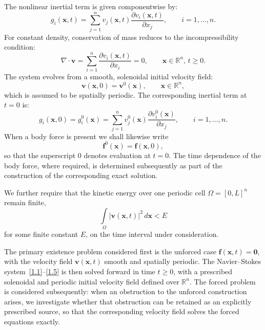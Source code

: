 \documentclass[11pt]{jfm}
\numberwithin{equation}{section}
\begin{document}
The nonlinear inertial term is given componentwise by:
\begin{equation}
\label{1.2}
g_i(\boldsymbol{x}, t) = \sum_{j=1}^n v_j(\boldsymbol{x}, t) \frac{\partial v_i(\boldsymbol{x}, t)}{\partial x_j}, \qquad i = 1, \dots, n.
\end{equation}
For constant density, conservation of mass reduces to the incompressibility condition:
\begin{equation}
\label{1.3}
\nabla \cdot \boldsymbol{v} = \sum_{i=1}^n \frac{\partial v_i(\boldsymbol{x}, t)}{\partial x_i} = 0, \qquad \boldsymbol{x} \in \mathbb{R}^n, \, t \geq 0.
\end{equation}
The system evolves from a smooth, solenoidal initial velocity field:
\begin{equation}
\label{1.4}
\boldsymbol{v}(\boldsymbol{x}, 0) = \boldsymbol{v}^0(\boldsymbol{x}), \qquad \boldsymbol{x} \in \mathbb{R}^n,
\end{equation}
which is assumed to be spatially periodic. The corresponding inertial term at \( t = 0 \) is:
\begin{equation}
\label{1.5}
g_i(\boldsymbol{x}, 0) = g_i^0(\boldsymbol{x}) = \sum_{j=1}^n v_j^0(\boldsymbol{x}) \frac{\partial v_i^0(\boldsymbol{x})}{\partial x_j}, \qquad i = 1, \dots, n.
\end{equation}
When a body force is present we shall likewise write
\[
\boldsymbol{f}^0(\boldsymbol{x})=\boldsymbol{f}(\boldsymbol{x},0),
\]
so that the superscript $0$ denotes evaluation at $t=0$. The time dependence of the body force,
where required, is determined subsequently as part of the construction of the corresponding exact
solution.

We further require that the kinetic energy over one periodic cell $\Omega=[0,L]^n$ remain finite,
\begin{equation}
\label{1.6}
\int\limits_{\Omega}\left|\boldsymbol{v}(\boldsymbol{x},t)\right|^2\,d\boldsymbol{x} < E
\end{equation}
for some finite constant $E$, on the time interval under consideration.

The primary existence problem considered first is the unforced case
\( \boldsymbol{f}(\boldsymbol{x}, t) = \boldsymbol{0} \), with the velocity field
\( \boldsymbol{v}(\boldsymbol{x}, t) \) smooth and spatially periodic. The
Navier--Stokes system~\eqref{1.1}--\eqref{1.5} is then solved forward in time
\( t \geq 0 \), with a prescribed solenoidal and periodic initial velocity field defined
over \( \mathbb{R}^n \). The forced problem is considered subsequently: when an obstruction to the unforced construction
arises, we investigate whether that obstruction can be retained as an explicitly prescribed
source, so that the corresponding velocity field solves the forced equations exactly.
\end{document}
